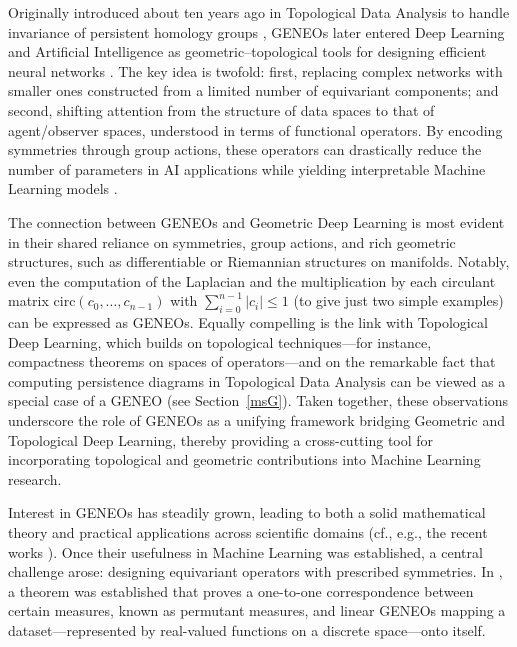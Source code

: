 \documentclass[11pt]{article}
\begin{document}
Originally introduced about ten years ago in Topological Data Analysis to handle invariance of persistent homology groups \cite{FrJa16}, GENEOs later entered Deep Learning and Artificial Intelligence as geometric–topological tools for designing efficient neural networks \cite{bergomi2019towards,Mi23}. 
The key idea is twofold: first, replacing complex networks with smaller ones constructed from a limited number of equivariant components; and second, shifting attention from the structure of data spaces to that of agent/observer spaces, understood in terms of functional operators. 
By encoding symmetries through group actions, these operators can drastically reduce the number of parameters in AI applications while yielding interpretable Machine Learning models \cite{BocchiFMPPGGLBF24,CoBoGiGiPeFr25}.

The connection between GENEOs and Geometric Deep Learning is most evident in their shared reliance on symmetries, group actions, and rich geometric structures, such as differentiable or Riemannian structures on manifolds. Notably, even the computation of the Laplacian and the multiplication by each circulant matrix $\mathrm{circ}(c_0,\ldots,c_{n-1})$ with $\sum_{i=0}^{n-1}|c_i|\le 1$ (to give just two simple examples) can be expressed as GENEOs. Equally compelling is the link with Topological Deep Learning, which builds on topological techniques—for instance, compactness theorems on spaces of operators—and on the remarkable fact that computing persistence diagrams in Topological Data Analysis can be viewed as a special case of a GENEO (see Section~\ref{msG}). Taken together, these observations underscore the role of GENEOs as a unifying framework bridging Geometric and Topological Deep Learning, thereby providing a cross-cutting tool for incorporating topological and geometric contributions into Machine Learning research.

Interest in GENEOs has steadily grown, leading to both a solid mathematical theory and practical applications across scientific domains (cf., e.g., the recent works \cite{Felipe2025,BoFeFr25,BoFrMi25,LaMiBoFrSo25,Ah26}). Once their usefulness in Machine Learning was established, a central challenge arose: designing equivariant operators with prescribed symmetries. In \cite{BoBoBrFrQu23}, a theorem was established that proves a one-to-one correspondence between certain measures, known as permutant measures, and linear GENEOs mapping a dataset—represented by real-valued functions on a discrete space—onto itself.
\end{document}
